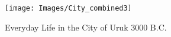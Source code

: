 
\begin{figure}
\begin{center}
  \texttt{[image: Images/City\_combined3]}
  \caption{ Everyday Life in the City of Uruk  3000 B.C.}
  \label{fig:execution}
\end{center}
\end{figure}


